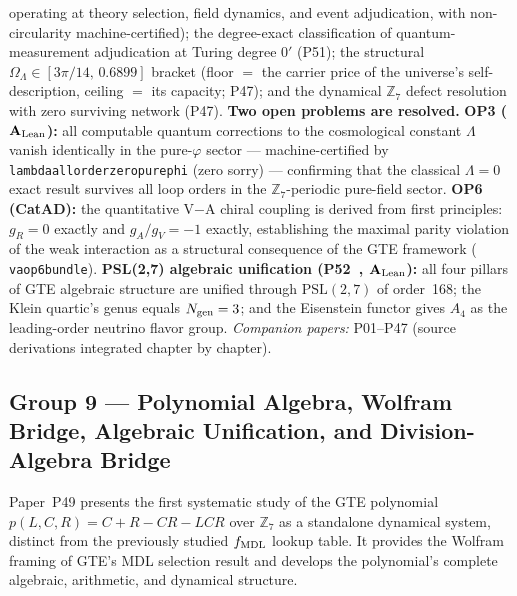 \documentclass[11pt]{article}
\newcommand{\lean}[1]{%
  \penalty-100
  \begingroup\def\_{{\textunderscore\allowbreak}}\texttt{#1}\endgroup}
\newcommand{\CatAL}{\ensuremath{\textbf{A}_{\rm Lean}}}
\begin{document}
operating at theory selection, field dynamics, and event adjudication, with
non-circularity machine-certified); the degree-exact classification of
quantum-measurement adjudication at Turing degree $0'$ (P51); the structural
$\Omega_\Lambda \in [3\pi/14,\,0.6899]$ bracket (floor $=$ the carrier price of
the universe's self-description, ceiling $=$ its capacity; P47); and the
dynamical $\mathbb{Z}_7$ defect resolution with zero surviving network (P47).
\textbf{Two open problems are resolved.}
\textbf{OP3 ($\CatAL$):} all computable quantum corrections to the cosmological
constant $\Lambda$ vanish identically in the pure-$\varphi$ sector ---
machine-certified by \lean{lambda\_all\_order\_zero\_pure\_phi} (zero sorry) ---
confirming that the classical $\Lambda = 0$ exact result survives all loop orders
in the $\mathbb{Z}_7$-periodic pure-field sector.
\textbf{OP6 (CatAD):} the quantitative V$-$A chiral coupling is derived from
first principles: $g_R = 0$ exactly and $g_A/g_V = -1$ exactly, establishing the
maximal parity violation of the weak interaction as a structural consequence of the
GTE framework (\lean{va\_op6\_bundle}).
\textbf{PSL(2,7) algebraic unification (P52~\cite{SpivackPSL27Unification}, $\CatAL$):} all four pillars of GTE
algebraic structure are unified through $\mathrm{PSL}(2,7)$ of order~168; the
Klein quartic's genus equals $N_{\rm gen} = 3$; and the Eisenstein functor gives
$A_4$ as the leading-order neutrino flavor group.
\emph{Companion papers:} P01--P47 (source derivations integrated chapter by chapter).

\subsection{Group 9 — Polynomial Algebra, Wolfram Bridge, Algebraic Unification, and Division-Algebra Bridge}

Paper~P49 presents the first systematic study of the GTE polynomial $p(L,C,R) = C+R-CR-LCR$
over $\mathbb{Z}_7$ as a standalone dynamical system, distinct from the previously studied
$f_{\rm MDL}$ lookup table.  It provides the Wolfram framing of GTE's MDL selection result
and develops the polynomial's complete algebraic, arithmetic, and dynamical structure.
\end{document}
